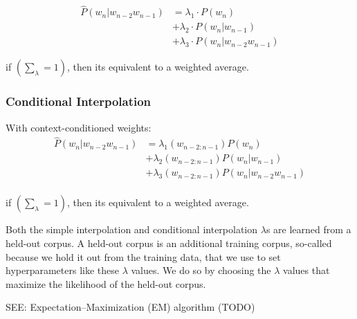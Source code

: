 \[
\begin{aligned}
    \hat{P}(w_n|w_{n-2}w_{n-1}) &= \lambda_1 \cdot P(w_n)  \\ 
    &+ \lambda_2 \cdot P(w_n|w_{n-1}) \\ 
    &+ \lambda_3 \cdot P(w_n|w_{n-2}w_{n-1}) 
\end{aligned}
\]


if \( \left( \sum_\lambda = 1 \right)\), then its equivalent to a weighted average.

\subsubsection{Conditional Interpolation}
With context-conditioned weights:
\[
\begin{aligned}
    \hat{P}(w_n|w_{n-2}w_{n-1}) &= \lambda_1(w_{n-2:n-1})P(w_n) \\ 
    &+ \lambda_2(w_{n-2:n-1})P(w_n|w_{n-1}) \\ 
    &+ \lambda_3(w_{n-2:n-1})P(w_n|w_{n-2}w_{n-1}) \\ 
\end{aligned}
\]

if \( \left( \sum_\lambda = 1 \right)\), then its equivalent to a weighted average.

Both the simple interpolation and conditional interpolation $\lambda$s are learned from a held-out corpus. A held-out corpus is an additional training corpus, so-called because we hold it out from the training data, that we use to set hyperparameters like these $\lambda$ values. We do so by choosing the $\lambda$ values that maximize the likelihood of the held-out corpus.

SEE: Expectation–Maximization (EM) algorithm (TODO)


